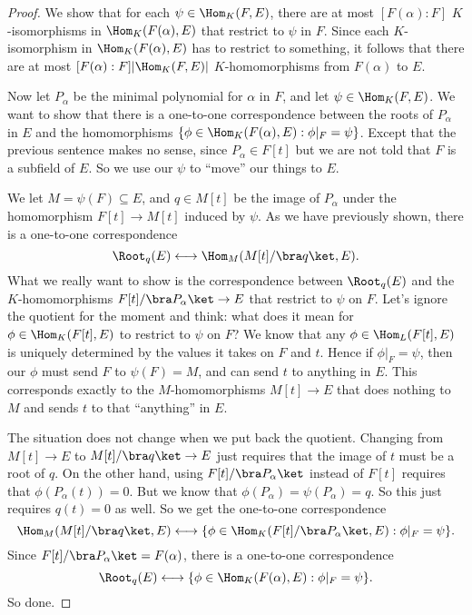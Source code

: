 \documentclass[a4paper]{article}
\begin{document}
\begin{proof}
  We show that for each $\psi \in \Hom_K(F, E)$, there are at most $[F(\alpha):F]$ $K$-isomorphisms in $\Hom_K(F(\alpha), E)$ that restrict to $\psi$ in $F$. Since each $K$-isomorphism in $\Hom_K(F(\alpha), E)$ has to restrict to something, it follows that there are at most $[F(\alpha): F] |\Hom_K(F, E)|$ $K$-homomorphisms from $F(\alpha)$ to $E$.

  Now let $P_\alpha$ be the minimal polynomial for $\alpha$ in $F$, and let $\psi \in \Hom_K(F, E)$. We want to show that there is a one-to-one correspondence between the roots of $P_\alpha$ in $E$ and the homomorphisms $\{\phi \in \Hom_K(F(\alpha), E): \phi|_F = \psi\}$. Except that the previous sentence makes no sense, since $P_\alpha \in F[t]$ but we are not told that $F$ is a subfield of $E$. So we use our $\psi$ to ``move'' our things to $E$.

  We let $M = \psi(F) \subseteq E$, and $q \in M[t]$ be the image of $P_\alpha$ under the homomorphism $F[t] \to M[t]$ induced by $\psi$. As we have previously shown, there is a one-to-one correspondence
  \[
    \Root_q(E) \longleftrightarrow \Hom_M(M[t]/\bra q \ket, E).
  \]
  What we really want to show is the correspondence between $\Root_q(E)$ and the $K$-homomorphisms $F[t]/\bra P_\alpha\ket \to E$ that restrict to $\psi$ on $F$. Let's ignore the quotient for the moment and think: what does it mean for $\phi \in \Hom_K(F[t], E)$ to restrict to $\psi$ on $F$? We know that any $\phi \in \Hom_L(F[t], E)$ is uniquely determined by the values it takes on $F$ and $t$. Hence if $\phi|_F = \psi$, then our $\phi$ must send $F$ to $\psi(F) = M$, and can send $t$ to anything in $E$. This corresponds exactly to the $M$-homomorphisms $M[t] \to E$ that does nothing to $M$ and sends $t$ to that ``anything'' in $E$.

  The situation does not change when we put back the quotient. Changing from $M[t] \to E$ to $M[t]/\bra q\ket \to E$ just requires that the image of $t$ must be a root of $q$. On the other hand, using $F[t]/\bra P_\alpha\ket$ instead of $F[t]$ requires that $\phi(P_\alpha(t)) = 0$. But we know that $\phi(P_\alpha) = \psi(P_\alpha) = q$. So this just requires $q(t) = 0$ as well. So we get the one-to-one correspondence
  \[
    \Hom_M(M[t]/\bra q \ket, E) \longleftrightarrow \{\phi \in \Hom_K(F[t]/\bra P_\alpha \ket, E): \phi|_F = \psi\}.
  \]
  Since $F[t]/\bra P_\alpha\ket = F(\alpha)$, there is a one-to-one correspondence
  \[
    \Root_q(E) \longleftrightarrow \{\phi \in \Hom_K(F(\alpha), E): \phi|_F = \psi\}.
  \]
  So done.
\end{proof}
\end{document}
